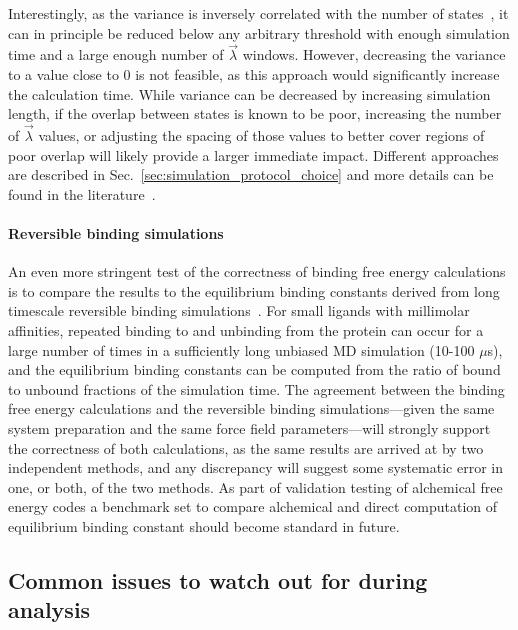 \documentclass[9pt,bestpractices,pubversion]{livecoms}
\begin{document}
Interestingly, as the variance is inversely correlated with the number of states~\cite{klimovich2015guidelines}, it can in principle be reduced below any arbitrary threshold with enough simulation time and a large enough number of $\vec{\lambda}$ windows. However, decreasing the variance to a value close to 0 is not feasible, as this approach would significantly increase the calculation time. While variance can be decreased by increasing simulation length, if the overlap between states is known to be poor, increasing the number of $\vec{\lambda}$ values, or adjusting the spacing of those values to better cover regions of poor overlap will likely provide a larger immediate impact. Different approaches are described in Sec.~\ref{sec:simulation_protocol_choice} and more details can be found in the literature~\cite{dakka2018concurrent, hahn2019alchemical}.

\paragraph{Reversible binding simulations}
An even more stringent test of the correctness of binding free energy calculations is to compare the results to the equilibrium binding constants derived from long timescale reversible binding simulations~\cite{pan2017quantitative}. For small ligands with millimolar affinities, repeated binding to and unbinding from the protein can occur for a large number of times in a sufficiently long unbiased MD simulation (10-100 $\mu$s), and the equilibrium binding constants can be computed from the ratio of bound to unbound fractions of the simulation time. The agreement between the binding free energy calculations and the reversible binding simulations---given the same system preparation and the same force field parameters---will strongly support the correctness of both calculations, as the same results are arrived at by two independent methods, and any discrepancy will suggest some systematic error in one, or both, of the two methods. As part of validation testing of alchemical free energy codes a benchmark set to compare alchemical and direct computation of equilibrium binding constant should become standard in future.

\subsection{Common issues to watch out for during analysis}
\end{document}
